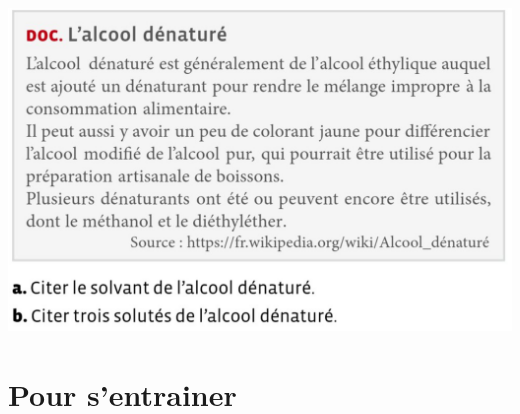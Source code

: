 \begin{center}
    \includegraphics[scale=0.6]{Images/Exo_Doc.png}
\end{center}


\section{Pour s'entrainer}

